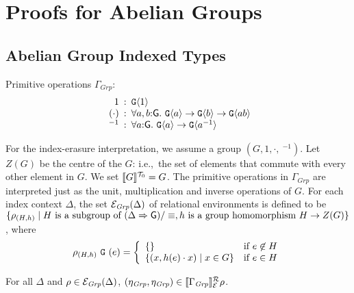 \section{Proofs for Abelian Groups}
\subsection{Abelian Group Indexed Types}
\label{sec:abelian-group-indexed-types}

\newcommand{\Grp}{\mathit{Grp}}

Primitive operations $\Gamma_\Grp$:
\begin{displaymath}
  \begin{array}{r@{\hspace{0.5em}:\hspace{0.5em}}l}
    1 & \tyPrim{G}{1} \\
    (\cdot) & \forall a,b\mathord:\mathsf{G}.\ \tyPrim{G}{a} \to \tyPrim{G}{b} \to \tyPrim{G}{a b} \\
    \ ^{-1} & \forall a\mathord:\mathsf{G}.\ \tyPrim{G}{a} \to \tyPrim{G}{a^{-1}}
  \end{array}
\end{displaymath}

For the index-erasure interpretation, we assume a group $(G, 1, \cdot,
\ ^{-1})$. Let $Z(G)$ be the centre of the $G$: i.e.,~the set of
elements that commute with every other element in $G$. We set
$\llbracket G \rrbracket^{\mathcal{T}_0} = G$. The primitive operations in $\Gamma_\Grp$ are
interpreted just as the unit, multiplication and inverse operations
of $G$. For each index context $\Delta$, the set
$\relEnv{E}_\Grp(\Delta)$ of relational environments is defined to be
$\{ \rho_{(H,h)} \mathrel| H\textrm{ is a subgroup of }(\Delta
\Rightarrow \mathsf{G})/\equiv, h\textrm{ is a group homomorphism }H
\to Z(G) \}$, where
\begin{displaymath}
  \rho_{(H,h)}\ \tyPrimNm{G}\ (e) = \left\{
    \begin{array}{ll}
      \{ \} & \textrm{if}\ e\not\in H \\
      \{ (x, h(e)\cdot x) \sepbar x \in G \} & \textrm{if}\ e\in H
    \end{array}
  \right.
\end{displaymath}

\begin{lemma}
  For all $\Delta$ and $\rho \in \relEnv{E}_\Grp(\Delta)$,
  $(\eta_\Grp,\eta_\Grp) \in \rsem{\Gamma_\Grp}{\relEnv{E}}\rho$.
\end{lemma}

